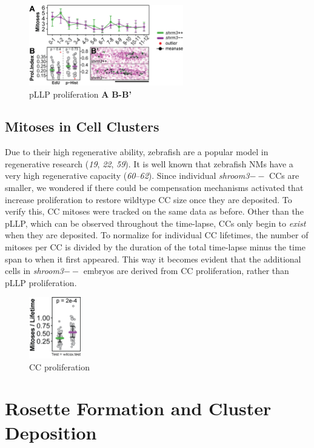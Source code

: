 \documentclass[11pt,singlespacinge,twoside]{reedthesis} %
\begin{document}
\begin{figure}

{\centering \includegraphics[width=0.6\textwidth]{figures/results/02_proliferation/prol_pllp} 

}

\caption[pLLP proliferation]{pLLP proliferation \textbf{A} \textbf{B-B'}}\label{fig:prolpllp}
\end{figure}
\hypertarget{res-prolcc}{%
\subsection{Mitoses in Cell Clusters}\label{res-prolcc}}

Due to their high regenerative ability, zebrafish are a popular model in regenerative research (\emph{19}, \emph{22}, \emph{59}). It is well known that zebrafish NMs have a very high regenerative capacity (\emph{60}--\emph{62}). Since individual \emph{shroom3}\(--\) CCs are smaller, we wondered if there could be compensation mechanisms activated that increase proliferation to restore wildtype CC size once they are deposited. To verify this, CC mitoses were tracked on the same data as before. Other than the pLLP, which can be observed throughout the time-lapse, CCs only begin to \emph{exist} when they are deposited. To normalize for individual CC lifetimes, the number of mitoses per CC is divided by the duration of the total time-lapse minus the time span to when it first appeared. This way it becomes evident that the additional cells in \emph{shroom3}\(--\) embryos are derived from CC proliferation, rather than pLLP proliferation.


\begin{figure}

{\centering \includegraphics[width=0.2\textwidth]{figures/results/02_proliferation/prol_cc} 

}

\caption[CC proliferation]{CC proliferation}\label{fig:prolcc}
\end{figure}
\hypertarget{rosette-formation-and-cluster-deposition}{%
\section{Rosette Formation and Cluster Deposition}\label{rosette-formation-and-cluster-deposition}}
\end{document}
